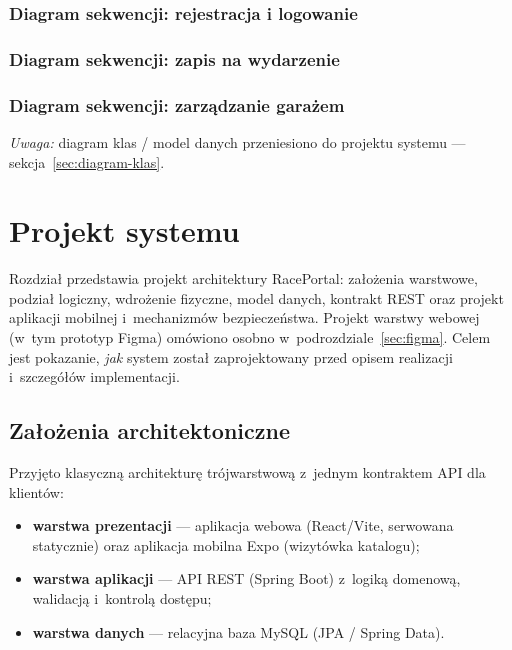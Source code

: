 \documentclass{sprz}
\begin{document}
\subsection{Diagram sekwencji: rejestracja i logowanie}
\subsection{Diagram sekwencji: zapis na wydarzenie}
\subsection{Diagram sekwencji: zarządzanie garażem}

\noindent\textit{Uwaga:} diagram klas / model danych przeniesiono do projektu systemu --- sekcja~\ref{sec:diagram-klas}.

\chapter{Projekt systemu}
\label{ch:projekt}
Rozdział przedstawia projekt architektury RacePortal: założenia warstwowe, podział logiczny, wdrożenie fizyczne, model danych, kontrakt REST oraz projekt aplikacji mobilnej i~mechanizmów bezpieczeństwa. Projekt warstwy webowej (w~tym prototyp Figma) omówiono osobno w~podrozdziale~\ref{sec:figma}. Celem jest pokazanie, \emph{jak} system został zaprojektowany przed opisem realizacji i~szczegółów implementacji.

\section{Założenia architektoniczne}
Przyjęto klasyczną architekturę trójwarstwową z~jednym kontraktem API dla klientów:
\begin{itemize}
  \item \textbf{warstwa prezentacji} --- aplikacja webowa (React/Vite, serwowana statycznie) oraz aplikacja mobilna Expo (wizytówka katalogu);
  \item \textbf{warstwa aplikacji} --- API REST (Spring Boot) z~logiką domenową, walidacją i~kontrolą dostępu;
  \item \textbf{warstwa danych} --- relacyjna baza MySQL (JPA / Spring Data).
\end{itemize}
\end{document}
